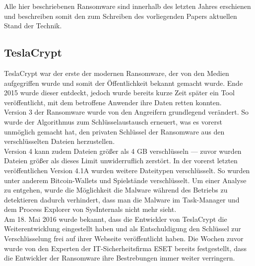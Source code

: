 Alle hier beschriebenen Ransomware sind innerhalb des letzten Jahres erschienen und beschreiben somit den zum Schreiben des vorliegenden Papers aktuellen Stand der Technik.

\subsection{TeslaCrypt}
TeslaCrypt war der erste der modernen Ransomware, der von den Medien aufgegriffen wurde und somit der Öffentlichkeit bekannt gemacht wurde. Ende 2015\cite{tesla:entdeckt} wurde dieser entdeckt, jedoch wurde bereits kurze Zeit später ein Tool veröffentlicht\cite{tesla:geknackt}, mit dem betroffene Anwender ihre Daten retten konnten.\\
Version 3 der Ransomware wurde von den Angreifern grundlegend verändert. So wurde der Algorithmus zum Schlüsselaustausch erneuert, was es vorerst unmöglich gemacht hat, den privaten Schlüssel der Ransomware aus den verschlüsselten Dateien herzustellen\cite{tesla:version3}\cite{tesla:version3_2}.\\
Version 4 kann zudem Dateien größer als 4 GB verschlüsseln\cite{tesla:version4} --- zuvor wurden Dateien größer als dieses Limit unwiderruflich zerstört. In der vorerst letzten veröffentlichen Version 4.1A\cite{tesla:version41} wurden weitere Dateitypen verschlüsselt. So wurden unter anderem Bitcoin-Wallets und Spielstände verschlüsselt. Um einer Analyse zu entgehen, wurde die Möglichkeit die Malware während des Betriebs zu detektieren dadurch verhindert, dass man die Malware im Task-Manager und dem Process Explorer von SysInternals nicht mehr sieht.\\
Am 18. Mai 2016 wurde bekannt\cite{tesla:end}, dass die Entwickler von TeslaCrypt die Weiterentwicklung eingestellt haben und als Entschuldigung den Schlüssel zur Verschlüsselung frei auf ihrer Webseite veröffentlicht haben. Die Wochen zuvor wurde von den Experten der IT-Sicherheitsfirma ESET bereits festgestellt, dass die Entwickler der Ransomware ihre Bestrebungen immer weiter verringern.

